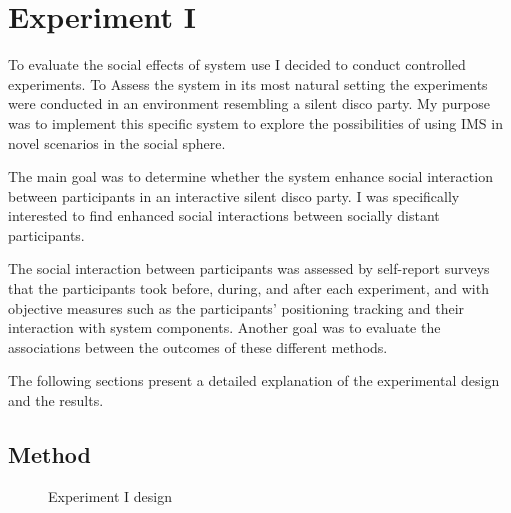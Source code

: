 \documentclass[a4paper,11pt]{article}
\begin{document}
{\clearpage\section{Experiment I}

To evaluate the social effects of system use I decided to conduct controlled experiments.
To Assess the system in its most natural setting the experiments were conducted in an environment resembling a silent disco party.
My purpose was to implement this specific system to explore the possibilities of using IMS in novel scenarios in the social sphere.

The main goal was to determine whether the system enhance social interaction between participants in an interactive silent disco party.
I was specifically interested to find enhanced social interactions between socially distant participants.

The social interaction between participants was assessed by self-report surveys that the participants took before, during, and after each experiment, and with objective measures such as the participants' positioning tracking and their interaction with system components.
Another goal was to evaluate the associations between the outcomes of these different methods.

The following sections present a detailed explanation of the experimental design and the results.

\subsection{Method}

\begin{figure}[!htb]
	\centering
	\def\svgwidth{0.95\columnwidth}
  	
	\caption{Experiment I design}\label{fig:pilot}
\end{figure}

}
\end{document}
